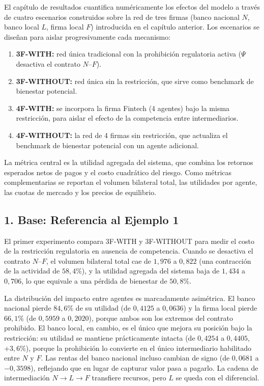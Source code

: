 \documentclass[12pt,a4paper]{article}
\begin{document}
El capítulo de resultados cuantifica numéricamente los efectos del modelo a través de cuatro
escenarios construidos sobre la red de tres firmas (banco nacional $N$, banco local $L$, firma
local $F$) introducida en el capítulo anterior. Los escenarios se diseñan para aislar
progresivamente cada mecanismo:

\begin{enumerate}[label=(\roman*)]
    \item \textbf{3F-WITH:} red única tradicional con la prohibición regulatoria activa ($\Psi$
    desactiva el contrato $N$--$F$).
    \item \textbf{3F-WITHOUT:} red única sin la restricción, que sirve como benchmark de
    bienestar potencial.
    \item \textbf{4F-WITH:} se incorpora la firma Fintech (4 agentes) bajo la misma restricción,
    para aislar el efecto de la competencia entre intermediarios.
    \item \textbf{4F-WITHOUT:} la red de 4 firmas sin restricción, que actualiza el benchmark de
    bienestar potencial con un agente adicional.
\end{enumerate}

La métrica central es la utilidad agregada del sistema, que combina los retornos esperados
netos de pagos y el costo cuadrático del riesgo. Como métricas complementarias se reportan
el volumen bilateral total, las utilidades por agente, las cuotas de mercado y los precios de
equilibrio.

\subsection*{1. Base: Referencia al Ejemplo 1}

El primer experimento compara 3F-WITH y 3F-WITHOUT para medir el costo de la restricción
regulatoria en ausencia de competencia. Cuando se desactiva el contrato $N$--$F$, el volumen
bilateral total cae de $1{,}976$ a $0{,}822$ (una contracción de la actividad de $58{,}4\%$), y la
utilidad agregada del sistema baja de $1{,}434$ a $0{,}706$, lo que equivale a una pérdida de
bienestar de $50{,}8\%$.

La distribución del impacto entre agentes es marcadamente asimétrica. El banco nacional
pierde $84{,}6\%$ de su utilidad (de $0{,}4125$ a $0{,}0636$) y la firma local pierde $66{,}1\%$
(de $0{,}5959$ a $0{,}2020$), porque ambos son los extremos del contrato prohibido. El banco
local, en cambio, es el único que mejora su posición bajo la restricción: su utilidad se mantiene
prácticamente intacta (de $0{,}4254$ a $0{,}4405$, $+3{,}6\%$), porque la prohibición lo
convierte en el único intermediario habilitado entre $N$ y $F$. Las rentas del banco nacional
incluso cambian de signo (de $0{,}0681$ a $-0{,}3598$), reflejando que en lugar de capturar
valor pasa a pagarlo. La cadena de intermediación $N \to L \to F$ transfiere recursos, pero $L$
se queda con el diferencial.
\end{document}
